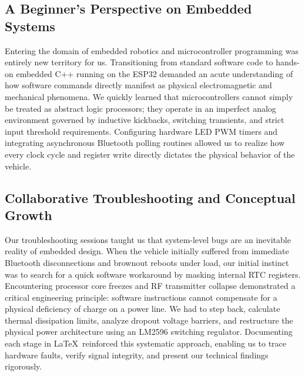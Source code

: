\documentclass[journal,12pt,onecolumn]{IEEEtran}
\begin{document}
\subsection{A Beginner's Perspective on Embedded Systems}
Entering the domain of embedded robotics and microcontroller programming was entirely new territory for us. %
Transitioning from standard software code to hands-on embedded C++ running on the ESP32 demanded an acute understanding of how software commands directly manifest as physical electromagnetic and mechanical phenomena. %
We quickly learned that microcontrollers cannot simply be treated as abstract logic processors; they operate in an imperfect analog environment governed by inductive kickbacks, switching transients, and strict input threshold requirements. %
Configuring hardware LED PWM timers and integrating asynchronous Bluetooth polling routines allowed us to realize how every clock cycle and register write directly dictates the physical behavior of the vehicle. %

\subsection{Collaborative Troubleshooting and Conceptual Growth}
Our troubleshooting sessions taught us that system-level bugs are an inevitable reality of embedded design. %
When the vehicle initially suffered from immediate Bluetooth disconnections and brownout reboots under load, our initial instinct was to search for a quick software workaround by masking internal RTC registers. %
Encountering processor core freezes and RF transmitter collapse demonstrated a critical engineering principle: software instructions cannot compensate for a physical deficiency of charge on a power line. %
We had to step back, calculate thermal dissipation limits, analyze dropout voltage barriers, and restructure the physical power architecture using an LM2596 switching regulator. %
Documenting each stage in \LaTeX\ reinforced this systematic approach, enabling us to trace hardware faults, verify signal integrity, and present our technical findings rigorously. %
\end{document}
